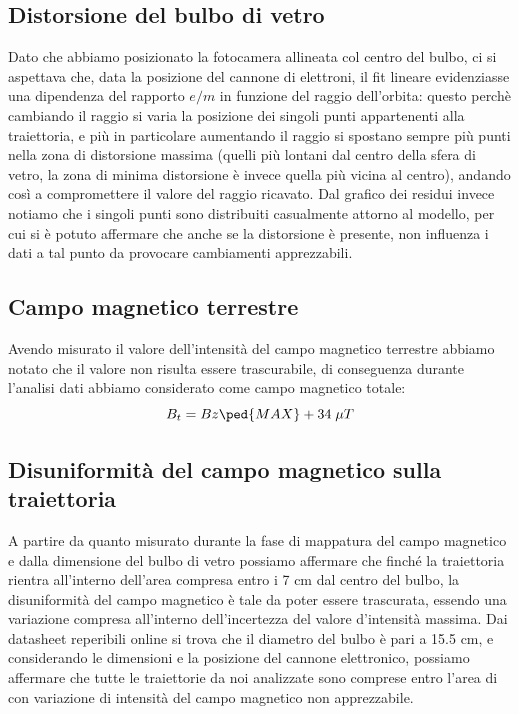 \documentclass[10pt, a4paper, italian]{article}
\begin{document}
\subsection{Distorsione del bulbo di vetro}
Dato che abbiamo posizionato la fotocamera allineata col centro del bulbo, ci si aspettava che, data la posizione del cannone di elettroni, il fit lineare evidenziasse una dipendenza del rapporto $e/m$ in funzione del raggio dell'orbita: questo perchè cambiando il raggio si varia la posizione dei singoli punti appartenenti alla traiettoria, e più in particolare aumentando il raggio si spostano sempre più punti nella zona di distorsione massima (quelli più lontani dal centro della sfera di vetro, la zona di minima distorsione è invece quella più vicina al centro), andando così a compromettere il valore del raggio ricavato.
Dal grafico dei residui invece notiamo che i singoli punti sono distribuiti casualmente attorno al modello, per cui si è potuto affermare che anche se la distorsione è presente, non influenza i dati a tal punto da provocare cambiamenti apprezzabili.

\subsection{Campo magnetico terrestre}
Avendo misurato il valore dell'intensità del campo magnetico terrestre abbiamo notato che il valore non risulta essere trascurabile, di conseguenza durante l'analisi dati abbiamo considerato come campo magnetico totale:
\[
B_t =Bz\ped{MAX} + 34 \;\mu T
\]
\subsection{Disuniformità del campo magnetico sulla traiettoria}
A partire da quanto misurato durante la fase di mappatura del campo magnetico e dalla dimensione del bulbo di vetro possiamo affermare che finché la traiettoria rientra all'interno dell'area compresa entro i 7 cm dal centro del bulbo, la disuniformità del campo magnetico è tale da poter essere trascurata, essendo una variazione compresa all'interno dell'incertezza del valore d'intensità massima.
Dai datasheet reperibili online si trova che il diametro del bulbo è pari a 15.5 cm, e considerando le dimensioni e la posizione del cannone elettronico, possiamo affermare che tutte le traiettorie da noi analizzate sono comprese entro l'area di con variazione di intensità del campo magnetico non apprezzabile.

\end{document}

